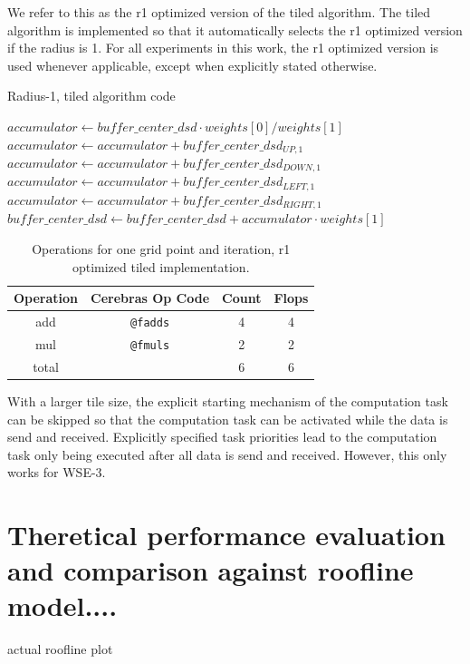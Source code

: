 \documentclass{article}
\begin{document}
We refer to this as the r1 optimized version of the tiled algorithm.
The tiled algorithm is implemented so that it automatically selects the r1 optimized version if the radius is 1.
For all experiments in this work, the r1 optimized version is used whenever applicable, except when explicitly stated otherwise.

\begin{algorithm}
    \caption{Radius-1, tiled algorithm code}
    \begin{algorithmic}[1]
        \State $accumulator \gets buffer\_center\_dsd \cdot weights[0]/weights[1]$
        \State $accumulator \gets accumulator + buffer\_center\_dsd_{UP,1}$
        \State $accumulator \gets accumulator + buffer\_center\_dsd_{DOWN,1}$
        \State $accumulator \gets accumulator + buffer\_center\_dsd_{LEFT,1}$
        \State $accumulator \gets accumulator + buffer\_center\_dsd_{RIGHT,1}$
        \State $buffer\_center\_dsd \gets buffer\_center\_dsd + accumulator \cdot weights[1]$
    \end{algorithmic}
\end{algorithm}

\begin{table}[h]
    \centering
    \begin{tabular}{|c|c|c|c|}
        \hline
        Operation & Cerebras Op Code & Count & Flops \\
        \hline
        add & \texttt{@fadds} & 4 & 4 \\
        mul & \texttt{@fmuls} & 2 & 2 \\
        \hline
        total & & 6 & 6 \\
        \hline
    \end{tabular}
    \caption{Operations for one grid point and iteration, r1 optimized tiled implementation.}
    \label{tab:tiled_operations_r1_optimized}
\end{table}

With a larger tile size, the explicit starting mechanism of the computation task can be skipped so that the computation task can be activated while the data is send and received. Explicitly specified task priorities lead to the computation task only being executed after all data is send and received. However, this only works for WSE-3.

\section{Theretical performance evaluation and comparison against roofline model....}
actual roofline plot
\end{document}
